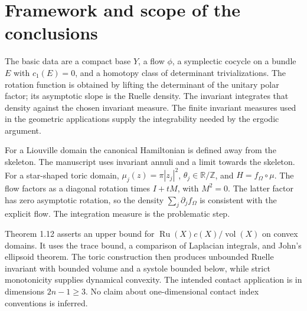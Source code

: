 \documentclass[10pt]{article}
\begin{document}
\section*{Framework and scope of the conclusions}
The basic data are a compact base \(Y\), a flow \(\phi\), a symplectic cocycle on a bundle \(E\) with \(c_1(E)=0\), and a homotopy class of determinant trivializations. The rotation function is obtained by lifting the determinant of the unitary polar factor; its asymptotic slope is the Ruelle density. The invariant integrates that density against the chosen invariant measure. The finite invariant measures used in the geometric applications supply the integrability needed by the ergodic argument.\par
For a Liouville domain the canonical Hamiltonian is defined away from the skeleton. The manuscript uses invariant annuli and a limit towards the skeleton. For a star-shaped toric domain, \(\mu_j(z)=\pi|z_j|^2\), \(\theta_j\in\mathbb R/\mathbb Z\), and \(H=f_\Omega\circ\mu\). The flow factors as a diagonal rotation times \(I+tM\), with \(M^2=0\). The latter factor has zero asymptotic rotation, so the density \(\sum_j\partial_jf_\Omega\) is consistent with the explicit flow. The integration measure is the problematic step.\par
Theorem 1.12 asserts an upper bound for \(\operatorname{Ru}(X)c(X)/\operatorname{vol}(X)\) on convex domains. It uses the trace bound, a comparison of Laplacian integrals, and John’s ellipsoid theorem. The toric construction then produces unbounded Ruelle invariant with bounded volume and a systole bounded below, while strict monotonicity supplies dynamical convexity. The intended contact application is in dimensions \(2n-1\ge3\). No claim about one-dimensional contact index conventions is inferred.\par
\end{document}
